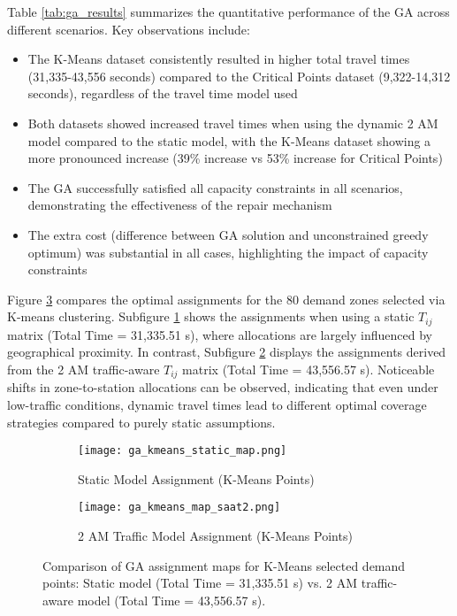 \documentclass[conference]{IEEEtran}
\begin{document}
Table \ref{tab:ga_results} summarizes the quantitative performance of the GA across different scenarios. Key observations include:
\begin{itemize}
    \item The K-Means dataset consistently resulted in higher total travel times (31,335-43,556 seconds) compared to the Critical Points dataset (9,322-14,312 seconds), regardless of the travel time model used
    \item Both datasets showed increased travel times when using the dynamic 2 AM model compared to the static model, with the K-Means dataset showing a more pronounced increase (39\% increase vs 53\% increase for Critical Points)
    \item The GA successfully satisfied all capacity constraints in all scenarios, demonstrating the effectiveness of the repair mechanism
    \item The extra cost (difference between GA solution and unconstrained greedy optimum) was substantial in all cases, highlighting the impact of capacity constraints
\end{itemize}

Figure \ref{fig:ga_assignments_kmeans} compares the optimal assignments for the 80 demand zones selected via K-means clustering. Subfigure \ref{fig:ga_kmeans_static_map_only} shows the assignments when using a static $T_{ij}$ matrix (Total Time = 31,335.51 s), where allocations are largely influenced by geographical proximity. In contrast, Subfigure \ref{fig:ga_kmeans_map_saat2_only} displays the assignments derived from the 2 AM traffic-aware $T_{ij}$ matrix (Total Time = 43,556.57 s). Noticeable shifts in zone-to-station allocations can be observed, indicating that even under low-traffic conditions, dynamic travel times lead to different optimal coverage strategies compared to purely static assumptions.

\begin{figure}[htbp]
    \centering
    \begin{subfigure}[b]{0.49\textwidth}
        \centering
        \texttt{[image: ga\_kmeans\_static\_map.png]}
        \caption{Static Model Assignment (K-Means Points)}
        \label{fig:ga_kmeans_static_map_only}
    \end{subfigure}
    \hfill
    \begin{subfigure}[b]{0.49\textwidth}
        \centering
        \texttt{[image: ga\_kmeans\_map\_saat2.png]}
        \caption{2 AM Traffic Model Assignment (K-Means Points)}
        \label{fig:ga_kmeans_map_saat2_only}
    \end{subfigure}
    \caption{Comparison of GA assignment maps for K-Means selected demand points: Static model (Total Time = 31,335.51 s) vs. 2 AM traffic-aware model (Total Time = 43,556.57 s).}
    \label{fig:ga_assignments_kmeans}
\end{figure}
\end{document}
